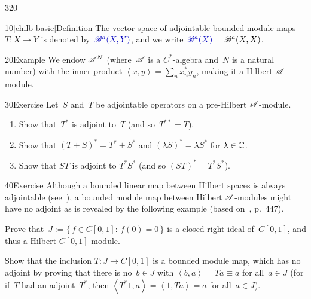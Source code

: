 \begin{parsec}{320}
\begin{point}{10}[chilb-basic]{Definition}
The vector space of adjointable bounded module maps~$T\colon X\to Y$ 
is denoted
by~$\Define{\scrB^a(X,Y)}$,%
and we write $\Define{\scrB^a(X)}=\scrB^a(X,X)$.%
\end{point}
\begin{point}{20}{Example}%
We endow $\mathscr{A}^N$
(where~$\mathscr{A}$ is a $C^*$-algebra and~$N$ is a natural number)
with the inner product $\left<x,y\right>=\sum_n x_n^*y_n$,
making it a Hilbert $\mathscr{A}$-module.
\end{point}
\begin{point}{30}{Exercise}%
Let~$S$ and~$T$ be adjointable operators on a 
pre-Hilbert $\mathscr{A}$-module.
\begin{enumerate}
\item
	Show that~$T^*$ is adjoint to~$T$ (and so~$T^{**}=T$).
\item
Show that $(T+S)^*=T^*+S^*$ 
and $(\lambda S)^*=\overline{\lambda}S^*$ for $\lambda\in \mathbb{C}$.
\item
Show that $ST$ is adjoint to $T^*S^*$
(and so $(ST)^*=T^*S^*$).
\end{enumerate}
\end{point}
\begin{point}{40}{Exercise}%
Although a bounded linear map between Hilbert spaces
is always adjointable (see~),
a bounded module map
between Hilbert $\mathscr{A}$-modules
might have no adjoint
as is revealed by the following example
(based on~\cite{paschke}, p.~447).

Prove that~$J:=\{\,f\in C[0,1]\colon\, f(0)=0\,\}$
is a closed right ideal of~$C[0,1]$, and thus a
Hilbert $C[0,1]$-module.

Show that the inclusion $T\colon J\to C[0,1]$
is a bounded module map,
which has no adjoint
by proving that there is no~$b\in J$
with $\left<b,a\right>=Ta\equiv a$ for all~$a\in J$
(for if~$T$ had an adjoint~$T^*$,
then $\left<T^*1,a\right>=\left<1,Ta\right>=a$
for all~$a\in J$).


\end{point}
\end{parsec}
